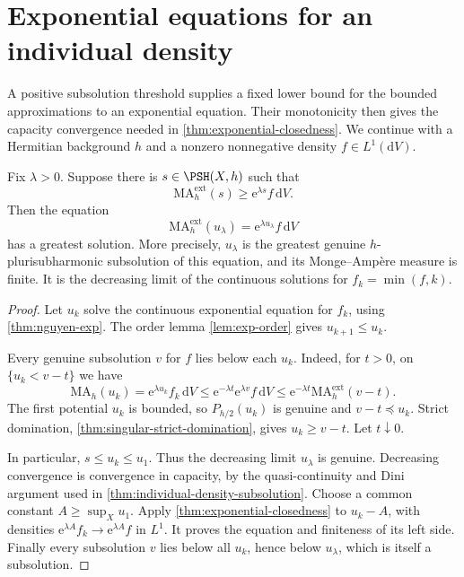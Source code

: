 \section{Exponential equations for an individual density}
\label{sec:individual-exponential-equations}

A positive subsolution threshold supplies a fixed lower bound for the bounded approximations to an exponential equation. Their monotonicity then gives the capacity convergence needed in \cref{thm:exponential-closedness}. We continue with a Hermitian background $h$ and a nonzero nonnegative density $f\in L^1(\mathrm{d}V)$.

\begin{theorem}\label{thm:individual-exponential-subsolution}
Fix $\lambda>0$. Suppose there is $s\in\PSH(X,h)$ such that
\[
 \mathrm{MA}^{\mathrm{ext}}_h(s)\geq\mathrm{e}^{\lambda s}f\,\mathrm{d}V.
\]
Then the equation
\[
 \mathrm{MA}^{\mathrm{ext}}_h(u_\lambda)
       =\mathrm{e}^{\lambda u_\lambda}f\,\mathrm{d}V
\]
has a greatest solution. More precisely, $u_\lambda$ is the greatest genuine $h$-plurisubharmonic subsolution of this equation, and its Monge--Amp\`ere measure is finite. It is the decreasing limit of the continuous solutions for $f_k=\min(f,k)$.
\end{theorem}
\begin{proof}
Let $u_k$ solve the continuous exponential equation for $f_k$, using \cref{thm:nguyen-exp}. The order lemma \cref{lem:exp-order} gives $u_{k+1}\leq u_k$.

Every genuine subsolution $v$ for $f$ lies below each $u_k$. Indeed, for $t>0$, on $\{u_k<v-t\}$ we have
\[
 \mathrm{MA}_h(u_k)=\mathrm{e}^{\lambda u_k}f_k\,\mathrm{d}V
 \leq\mathrm{e}^{-\lambda t}\mathrm{e}^{\lambda v}f\,\mathrm{d}V
 \leq\mathrm{e}^{-\lambda t}\mathrm{MA}^{\mathrm{ext}}_h(v-t).
\]
The first potential $u_k$ is bounded, so $P_{h/2}(u_k)$ is genuine and $v-t\preceq u_k$. Strict domination, \cref{thm:singular-strict-domination}, gives $u_k\geq v-t$. Let $t\downarrow0$.

In particular, $s\leq u_k\leq u_1$. Thus the decreasing limit $u_\lambda$ is genuine. Decreasing convergence is convergence in capacity, by the quasi-continuity and Dini argument used in \cref{thm:individual-density-subsolution}. Choose a common constant $A\geq\sup_Xu_1$. Apply \cref{thm:exponential-closedness} to $u_k-A$, with densities $\mathrm{e}^{\lambda A}f_k\to\mathrm{e}^{\lambda A}f$ in $L^1$. It proves the equation and finiteness of its left side. Finally every subsolution $v$ lies below all $u_k$, hence below $u_\lambda$, which is itself a subsolution.
\end{proof}

